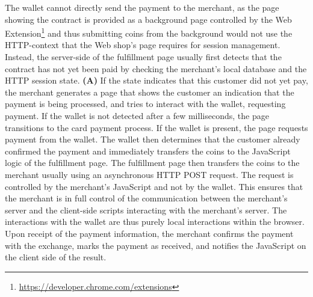 \documentclass{IEEEtran}
\begin{document}
The wallet cannot directly send
the payment to the merchant, as the page showing the contract is
provided as a background page controlled by the Web Extension\footnote{\url{https://developer.chrome.com/extensions}} and thus
submitting coins from the background would not use the HTTP-context
that the Web shop's page requires for session management.
%
Instead, the server-side of the fulfillment page usually first detects
that the contract has not yet been paid by checking the merchant's
local database and the HTTP session state.  {\bf (A)} If the state
indicates that this customer did not yet pay, the merchant generates a
page that shows the customer an indication that the payment is being
processed, and tries to interact with the wallet, requesting payment.
If the wallet is not detected after a few milliseconds, the page
transitions to the card payment process.  If the wallet is present,
the page requests payment from the wallet.  The wallet then determines
that the customer already confirmed the payment and immediately
transfers the coins to the JavaScript logic of the fulfillment page.
The fulfillment page then transfers the coins to the merchant usually
using an asynchronous HTTP POST request.  The request is controlled by
the merchant's JavaScript and not by the wallet. This ensures that the
merchant is in full control of the communication between the
merchant's server and the client-side scripts interacting with the
merchant's server.  The interactions with the wallet are thus purely
local interactions within the browser.  Upon receipt of the payment
information, the merchant confirms the payment with the exchange,
marks the payment as received, and notifies the JavaScript on the
client side of the result.
\end{document}
